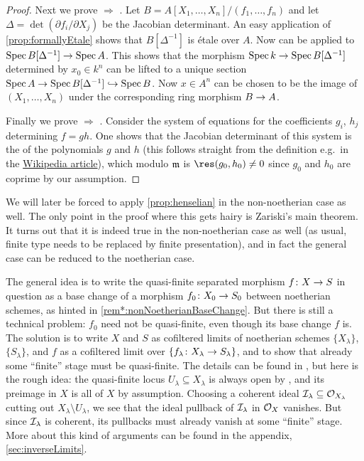 \begin{proof}
	Next we prove  $\Rightarrow$ . Let $B=A[X_1,\dotsc,X_n]/(f_1,\dotsc,f_n)$ and let $\Delta=\det(\partial f_i/\partial X_j)$ be the Jacobian determinant. An easy application of \cref{prop:formallyEtale} shows that $B[\Delta^{-1}]$ is étale over $A$. Now  can be applied to $\Spec B[\Delta^{-1}]\morphism \Spec A$. This shows that the morphism $\Spec k\morphism \Spec B[\Delta^{-1}]$ determined by $x_0\in k^n$ can be lifted to a unique section $\Spec A\morphism \Spec B[\Delta^{-1}]\monomorphism \Spec B$. Now $x\in A^n$ can be chosen to be the image of $(X_1,\dotsc,X_n)$ under the corresponding ring morphism $B\morphism A$. 
	
	Finally we prove  $\Rightarrow$ . Consider the system of equations for the coefficients $g_i$, $h_j$ determining $f=gh$. One shows that the Jacobian determinant of this system is the  of the polynomials $g$ and $h$ (this follows straight from the definition e.g.\ in the \href{https://en.wikipedia.org/wiki/Resultant}{Wikipedia article}), which modulo $\mathfrak{m}$ is $\res(g_0,h_0)\neq 0$ since $g_0$ and $h_0$ are coprime by our assumption.
\end{proof}
\begin{rem}\label{rem:nonNoetherian}
	We will later be forced to apply \cref{prop:henselian} in the non-noetherian case as well. The only point in the proof where this gets hairy is Zariski's main theorem. It turns out that it is indeed true in the non-noetherian case as well (as usual, finite type needs to be replaced by finite presentation), and in fact the general case can be reduced to the noetherian case.
	
	The general idea is to write the quasi-finite separated morphism $f\colon X\morphism S$ in question as a base change of a morphism $f_0\colon X_0\morphism S_0$ between noetherian schemes, as hinted in \cref{rem*:nonNoetherianBaseChange}. But there is still a technical problem: $f_0$ need not be quasi-finite, even though its base change $f$ is. The solution is to write $X$ and $S$ as cofiltered limits of noetherian schemes $\{X_\lambda\}$, $\{S_\lambda\}$, and $f$ as a cofiltered limit over $\{f_\lambda\colon X_\lambda\morphism S_\lambda\}$, and to show that already some \enquote{finite} stage must be quasi-finite. The details can be found in \cite[Théorème~(8.10.5)]{egaIV3}, but here is the rough idea: the quasi-finite locus $U_\lambda\subseteq X_\lambda$ is always open by \cite[Theorem~2]{jacobians}, and its preimage in $X$ is all of $X$ by assumption. Choosing a coherent ideal $\mathcal{I}_\lambda\subseteq \mathcal{O}_{X_\lambda}$ cutting out $X_\lambda\setminus U_\lambda$, we see that the ideal pullback of $\mathcal{I}_\lambda$ in $\mathcal{O}_X$ vanishes. But since $\mathcal{I}_\lambda$ is coherent, its pullbacks must already vanish at some \enquote{finite} stage. More about this kind of arguments can be found in the appendix, \cref{sec:inverseLimits}.
\end{rem}

